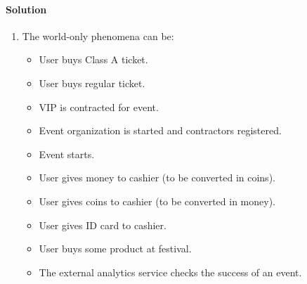 \paragraph*{Solution}
\begin{enumerate}
    \item The world-only phenomena can be: 
        \begin{itemize}
            \item User buys Class A ticket.
            \item User buys regular ticket.
            \item VIP is contracted for event.
            \item Event organization is started and contractors registered.
            \item Event starts.
            \item User gives money to cashier (to be converted in coins).
            \item User gives coins to cashier (to be converted in money).
            \item User gives ID card to cashier.
            \item User buys some product at festival.
            \item The external analytics service checks the success of an event.
        \end{itemize}


\end{enumerate}
